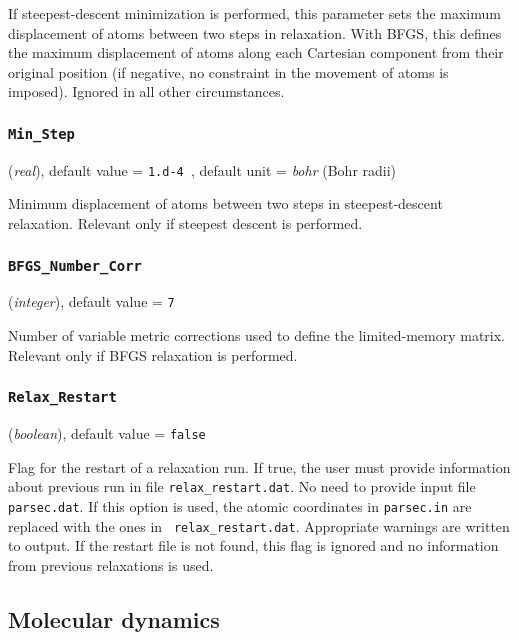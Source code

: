 \documentclass{article}
\begin{document}
If steepest-descent minimization is performed, this parameter sets the
maximum displacement of atoms between two steps in relaxation.
With BFGS, this defines the maximum displacement of atoms along
each Cartesian component from their original position (if negative, no
constraint in the movement of atoms is imposed). Ignored in all other
circumstances.

\subsubsection{\tt Min\_Step 
\label{MinStep}}
({\it real}),
default value = {\tt 1.d-4 },
default unit = {\it bohr} (Bohr radii)

Minimum displacement of atoms between two steps in steepest-descent 
relaxation. Relevant only if steepest descent is performed.

\subsubsection{\tt BFGS\_Number\_Corr 
\label{BFGSNumberCorr}}
({\it integer}),
default value = {\tt 7 }

Number of variable metric corrections used to define the limited-memory
matrix. Relevant only if BFGS relaxation is performed.

\subsubsection{\tt Relax\_Restart 
\label{RelaxRestart}}
({\it boolean}),
default value = {\tt false }

Flag for the restart of a relaxation run. If true, the user must provide 
information about previous run in file {\tt relax\_restart.dat}. No need 
to provide input file {\tt parsec.dat}. If this option is used, the 
atomic coordinates in {\tt parsec.in} are replaced with the ones in {\tt 
relax\_restart.dat}. Appropriate warnings are written to output. If the 
restart file is not found, this flag is ignored and no information from 
previous relaxations is used.









\subsection{Molecular dynamics}
\end{document}
